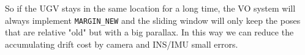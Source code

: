 \documentclass[12pt]{report}   %
\begin{document}
So if the UGV stays in the same location for a long time, the VO system will always implement \verb|MARGIN_NEW| and the sliding window will only keep the poses that are relative "old" but with a big parallax. In this way we can reduce the accumulating drift cost by camera and INS/IMU small errors.




















\newpage 


\end{document}
